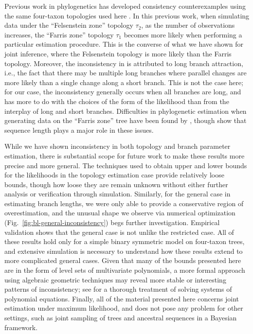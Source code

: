 \documentclass{article}
\begin{document}
Previous work in phylogenetics has developed consistency counterexamples using the same four-taxon topologies used here \cite{Felsenstein1978-rr}.
In this previous work, when simulating data under the ``Felsenstein zone'' topology $\tau_2$, as the number of observations increases, the ``Farris zone'' topology $\tau_1$ becomes more likely when performing a particular estimation procedure.
This is the converse of what we have shown for joint inference, where the Felsenstein topology is more likely than the Farris topology.
Moreover, the inconsistency in \cite{Felsenstein1978-rr} is attributed to long branch attraction, i.e., the fact that there may be multiple long branches where parallel changes are more likely than a single change along a short branch.
This is not the case here; for our case, the inconsistency generally occurs when all branches are long, and has more to do with the choices of the form of the likelihood than from the interplay of long and short branches.
Difficulties in phylogenetic estimation when generating data on the ``Farris zone'' tree have been found by \cite{Siddall1998-hq}, though \cite{Swofford2001-hr} show that sequence length plays a major role in these issues.

While we have shown inconsistency in both topology and branch parameter estimation, there is substantial scope for future work to make these results more precise and more general.
The techniques used to obtain upper and lower bounds for the likelihoods in the topology estimation case provide relatively loose bounds, though how loose they are remain unknown without either further analysis or verification through simulation.
Similarly, for the general case in estimating branch lengths, we were only able to provide a conservative region of overestimation, and the unusual shape we observe via numerical optimization (Fig.~\ref{fig:bl-general-inconsistency}) begs further investigation.
Empirical validation shows that the general case is not unlike the restricted case.
All of these results hold only for a simple binary symmetric model on four-taxon trees, and extensive simulation is necessary to understand how these results extend to more complicated general cases.
Given that many of the bounds presented here are in the form of level sets of multivariate polynomials, a more formal approach using algebraic geometric techniques may reveal more stable or interesting patterns of inconsistency; see \cite{Sturmfels2002} for a thorough treatment of solving systems of polynomial equations.
Finally, all of the material presented here concerns joint estimation under maximum likelihood, and does not pose any problem for other settings, such as joint sampling of trees and ancestral sequences in a Bayesian framework.
\end{document}
